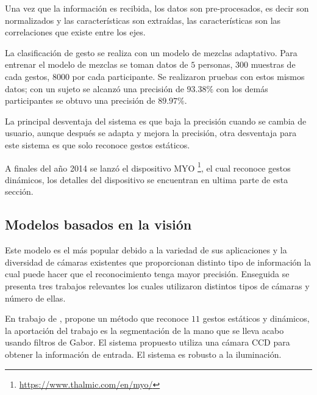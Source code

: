 Una vez que la información es recibida, los datos son pre-procesados, es decir son normalizados y las características son extraídas, las características son las correlaciones que existe entre los ejes.    
 
La clasificación de gesto se realiza con un modelo de mezclas adaptativo. Para entrenar el modelo de mezclas se toman datos de $5$ personas, $300$ muestras de cada gestos, $8000$ por cada participante. Se realizaron pruebas con estos mismos datos; con un sujeto se alcanzó una precisión de $93.38 \%$ con los demás participantes se obtuvo una precisión de $89.97 \%$.  

La principal desventaja del sistema es que baja la precisión cuando se cambia de usuario, aunque después se adapta y mejora la precisión, otra desventaja para este sistema es que solo reconoce gestos estáticos. 

A finales del año 2014 se lanzó el dispositivo MYO \footnote{\url{https://www.thalmic.com/en/myo/}}, el cual reconoce gestos dinámicos, los detalles del dispositivo se encuentran en ultima parte de esta sección. 


\subsection{Modelos basados en la visión}   

Este modelo es el más popular debido a la variedad de sus aplicaciones y la diversidad de cámaras existentes que proporcionan distinto tipo de información la cual puede hacer que el reconocimiento tenga mayor precisión. Enseguida se presenta tres  trabajos relevantes los cuales utilizaron distintos tipos de cámaras y número de ellas. 


En trabajo de \citep{Huang2011}, propone un método que reconoce $11$ gestos estáticos y dinámicos, la aportación del trabajo es la segmentación de la mano que se lleva acabo usando filtros de Gabor. El sistema propuesto utiliza una cámara CCD para obtener la información de entrada. El sistema es robusto a la iluminación. 
 
